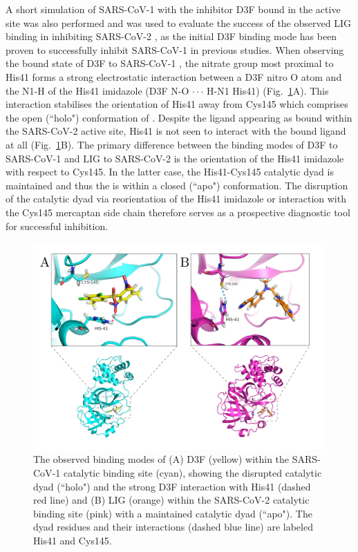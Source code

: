 A short simulation of SARS-CoV-1  with the inhibitor D3F bound in the active site was also performed and was used to evaluate the success of the observed LIG binding in inhibiting SARS-CoV-2 \!\!, as the initial D3F binding mode has been proven to successfully inhibit SARS-CoV-1  in previous studies.\cite{d3f} When observing the bound state of D3F to SARS-CoV-1 \!\!, the nitrate group most proximal to His41 forms a strong electrostatic interaction between a D3F nitro O atom and the N1-H of the His41 imidazole (D3F N-O $\cdot\cdot\cdot$ H-N1 His41) (Fig.~\ref{fig:bound_structures}A). This interaction stabilises the orientation of His41 away from Cys145 which comprises the open (``holo") conformation of \!\!. Despite the ligand appearing as bound within the SARS-CoV-2  active site, His41 is not seen to interact with the bound ligand at all (Fig.~\ref{fig:bound_structures}B). The primary difference between the binding modes of D3F to SARS-CoV-1  and LIG to SARS-CoV-2  is the orientation of the His41 imidazole with respect to Cys145. In the latter case, the His41-Cys145 catalytic dyad is maintained and thus the  is within a closed (``apo") conformation. The disruption of the catalytic dyad via reorientation of the His41 imidazole or interaction with the Cys145 mercaptan side chain\cite{jin2020structure} therefore serves as a prospective diagnostic tool for successful inhibition.

\begin{figure}
    \centering
    \includegraphics[width=\linewidth]{figures/side_by_side_labeled.pdf}
    \caption{The observed binding modes of (A) D3F (yellow) within the SARS-CoV-1  catalytic binding site (cyan), showing the disrupted catalytic dyad (``holo") and the strong D3F interaction with His41 (dashed red line) and (B) LIG (orange) within the SARS-CoV-2  catalytic binding site (pink) with a maintained catalytic dyad (``apo"). The dyad residues and their interactions (dashed blue line) are labeled His41 and Cys145.}
    \label{fig:bound_structures}
\end{figure}
